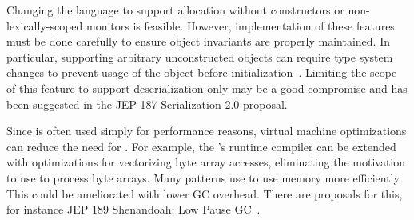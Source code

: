 Changing the language to support allocation without constructors or non-lexically-scoped monitors is feasible.
However, implementation of these
features must be done carefully to ensure object invariants
are properly maintained.
In particular, supporting arbitrary unconstructed
objects can require type system changes to prevent usage of the object 
before initialization~\citep{qiMaskedTypesSound2009}.
Limiting the scope of this feature to support deserialization only may be a good compromise and
has been suggested in the JEP 187 Serialization 2.0 proposal.

Since \unsafe{} is often used simply for performance reasons,
virtual machine optimizations can reduce the need for \unsafe{}.
For example, the \jvm{}'s runtime compiler can be extended with optimizations for vectorizing byte array accesses,
eliminating the motivation to use \unsafe{} to process byte arrays.
Many patterns use \unsafe{} to use memory more efficiently.
This could be ameliorated with lower GC overhead.
There are proposals for this, for instance JEP 189 Shenandoah:
Low Pause GC~\citep{jep189}.

